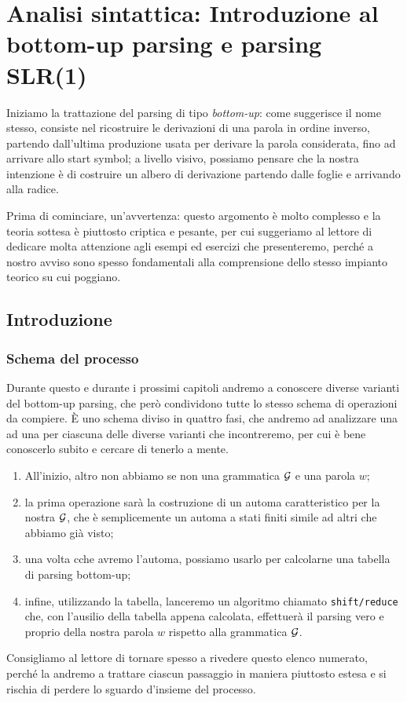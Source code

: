 \documentclass[class=book, crop=false, oneside, 12pt]{standalone}
\begin{document}
\chapter[Parsing bottom-up: introduzione e SLR(1)]{Analisi sintattica: Introduzione al bottom-up parsing e parsing SLR(1)}
Iniziamo la trattazione del parsing di tipo \emph{bottom-up}: come suggerisce il nome stesso, consiste nel ricostruire le derivazioni di una parola in ordine inverso, partendo dall'ultima produzione usata per derivare la parola considerata, fino ad arrivare allo start symbol; a livello visivo, possiamo pensare che la nostra intenzione è di costruire un albero di derivazione partendo dalle foglie e arrivando alla radice. 

Prima di cominciare, un'avvertenza: questo argomento è molto complesso e la teoria sottesa è piuttosto criptica e pesante, per cui suggeriamo al lettore di dedicare molta attenzione agli esempi ed esercizi che presenteremo, perché a nostro avviso sono spesso fondamentali alla comprensione dello stesso impianto teorico su cui poggiano.

\section{Introduzione}
\subsection{Schema del processo}
\label{subsec:schema}
Durante questo e durante i prossimi capitoli andremo a conoscere diverse varianti del bottom-up parsing, che però condividono tutte lo stesso schema di operazioni da compiere. È uno schema diviso in quattro fasi, che andremo ad analizzare una ad una per ciascuna delle diverse varianti che incontreremo, per cui è bene conoscerlo subito e cercare di tenerlo a mente.
\begin{enumerate}
    \item All'inizio, altro non abbiamo se non una grammatica \(\mathcal{G}\) e una parola \(w\);
    \item la prima operazione sarà la costruzione di un automa caratteristico per la nostra \(\mathcal{G}\), che è semplicemente un automa a stati finiti simile ad altri che abbiamo già visto;
    \item una volta cche avremo l'automa, possiamo usarlo per calcolarne una tabella di parsing bottom-up;
    \item infine, utilizzando la tabella, lanceremo un algoritmo chiamato \texttt{shift/reduce} che, con l'ausilio della tabella appena calcolata, effettuerà il parsing vero e proprio della nostra parola \(w\) rispetto alla grammatica \(\mathcal{G}\).
\end{enumerate}
Consigliamo al lettore di tornare spesso a rivedere questo elenco numerato, perché la andremo a trattare ciascun passaggio in maniera piuttosto estesa e si rischia di perdere lo sguardo d'insieme del processo.
\end{document}
